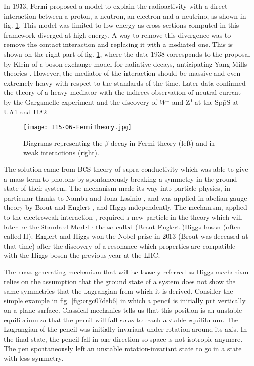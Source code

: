 In 1933, Fermi proposed a model \cite{Fermi:1933jpa,Fermi2008} to explain the radioactivity with a direct interaction between a proton, a neutron, an electron and a neutrino, as shown in fig. \ref{fig:orgfa8568d}.
This model was limited to low energy as cross-sections computed in this framework diverged at high energy.
A way to remove this divergence was to remove the contact interaction and replacing it with a mediated one.
This is shown on the right part of fig. \ref{fig:orgfa8568d}, where the date 1938 corresponds to the proposal by Klein \cite{Klein:1938jm} of a boson exchange model for radiative decays, anticipating Yang-Mills theories \cite{Yang:1954ek}.
However, the mediator of the interaction should be massive and even extremely heavy with respect to the standards of the time.
Later data confirmed the theory of a heavy mediator with the indirect observation of neutral current by the Gargamelle experiment \cite{Gargamelle,Hasert:1973cr} and the discovery of \(W^{\pm}\) and Z\(^{\text{0}}\) at the \(\text{Sp}\bar{\text{p}}\text{S}\) at UA1 \cite{CERN-EP-83-13,1983398} and UA2 \cite{CERN-EP-83-25,CERN-EP-83-112}.

\begin{figure}[htbp]
\centering
\texttt{[image: I15-06-FermiTheory.jpg]}
\caption{\label{fig:orgfa8568d}
Diagrams representing the \(\beta\) decay in Fermi theory (left) and in weak interactions (right).}
\end{figure}


The solution came from BCS theory of supra-conductivity \cite{PhysRev.108.1175} which was able to give a mass term to photons by spontaneously breaking a symmetry in the ground state of their system.
The mechanism made its way into particle physics, in particular thanks to Nambu and Jona Lasinio \cite{Nambu:1961fr,Nambu:1961tp,Nambu:1960xd,Nambu:1960tm}, and was applied in abelian gauge theory by Brout and Englert \cite{BroutEnglert}, and Higgs \cite{Higgs64} independently.
The mechanism, applied to the electroweak interaction \cite{PhysRevLett.19.1264,SALAM1964168}, required a new particle in the theory which will later be the Standard Model : the so called (Brout-Englert-)Higgs boson (often called H).
Englert and Higgs won the Nobel prize in 2013 (Brout was deceased at that time) after the discovery \cite{CERN-PH-EP-2012-218,CERN-PH-EP-2012-220} of a resonance which properties are compatible with the Higgs boson the previous year at the LHC.


The mass-generating mechanism that will be loosely referred as Higgs mechanism relies on the assumption that the ground state of a system does not show the same symmetries that the Lagrangian from which it is derived.
Consider the simple example in fig. \ref{fig:orgc07deb6} in which a pencil is initially put vertically on a plane surface.
Classical mechanics tells us that this position is an unstable equilibrium so that the pencil will fall so as to reach a stable equilibrium.
The Lagrangian of the pencil was initially invariant under rotation around its axis.
In the final state, the pencil fell in one direction so space is not isotropic anymore.
The pen spontaneously left an unstable rotation-invariant state to go in a state with less symmetry.

